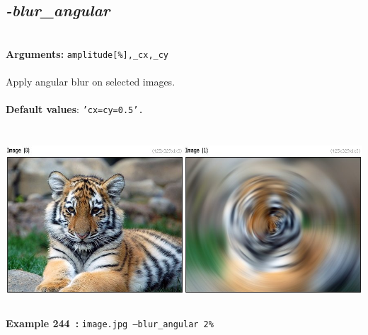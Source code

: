\documentclass[a4paper,11pt,twoside]{book}
\begin{document}
\subsection{\emph{-blur\_angular} }\vspace*{-0.5em}
~\\\textbf{Arguments: } 
{\small \texttt{amplitude[\%],\_cx,\_cy}}\\~\\
Apply angular blur on selected images.
~\\~\\\textbf{Default values}: {\small \texttt{'cx=cy=0.5'.}}
\begin{center}\includegraphics[keepaspectratio=true,height=7cm,width=\textwidth]{img/gmic_def244.jpg}\\
{\footnotesize \textbf{Example 244~:} \texttt{image.jpg --blur\_angular 2\%}}
\end{center}
\end{document}
